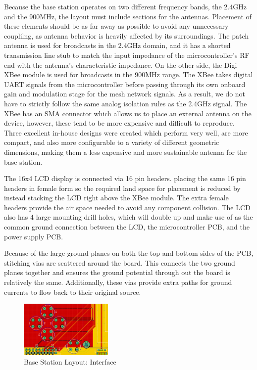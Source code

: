 \documentclass[journal,compsoc]{IEEEtran}
\begin{document}
Because the base station operates on two different frequency bands, the 2.4GHz and the 900MHz, the layout must include sections for the antennas. Placement of these elements should be as far away as possible to avoid any unnecessary couplilng, as antenna behavior is heavily affected by its surroundings. The patch antenna is used for broadcasts in the 2.4GHz domain, and it has a shorted transmission line stub to match the input impedance of the microcontroller's RF end with the antenna's characteristic impedance. On the other side, the Digi XBee module is used for broadcasts in the 900MHz range. The XBee takes digital UART signals from the microcontroller before passing through its own onboard gain and modulation stage for the mesh network signals. As a result, we do not have to strictly follow the same analog isolation rules as the 2.4GHz signal. The XBee has an SMA connector which allows us to place an external antenna on the device, however, these tend to be more expensive and difficult to reproduce. Three excellent in-house designs were created which perform very well, are more compact, and also more configurable to a variety of different geometric dimensions, making them a less expensive and more sustainable antenna for the base station.

The 16x4 LCD display is connected via 16 pin headers. placing the same 16 pin headers in female form so the required land space for placement is reduced by instead stacking the LCD right above the XBee module. The extra female headers provide the air space needed to avoid any component collision. The LCD also has 4 large mounting drill holes, which will double up and make use of as the common ground connection between the LCD, the microcontroller PCB, and the power supply PCB.

Because of the large ground planes on both the top and bottom sides of the PCB, stitching vias are scattered around the board. This connects the two ground planes together and ensures the ground potential through out the board is relatively the same. Additionally, these vias provide extra paths for ground currents to flow back to their original source.

\begin{figure}[ht] 	%
\centering
\includegraphics[width=0.4\textwidth]{base-layout-interface.PNG}
\caption{ \space Base Station Layout: Interface}
\label{base-lay-btn}
\end{figure}
\end{document}
